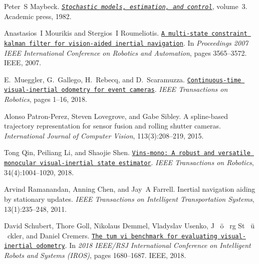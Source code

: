 \begin{DoxyDescription}
\item[\label{_CITEREF_Maybeck1982STOC}%
\mbox{[}15\mbox{]}]Peter~S Maybeck. \href{https://books.google.com/books?id=L_YVMUJKNQUC}{\tt {\itshape Stochastic models, estimation, and control}}, volume~3. Academic press, 1982.


\item[\label{_CITEREF_Mourikis2007ICRA}%
\mbox{[}16\mbox{]}]Anastasios~I Mourikis and Stergios~I Roumeliotis. \href{http://citeseerx.ist.psu.edu/viewdoc/download?doi=10.1.1.437.1085&amp;rep=rep1&amp;type=pdf}{\tt A multi-\/state constraint kalman filter for vision-\/aided inertial navigation}. In {\itshape Proceedings 2007 I\+E\+EE International Conference on Robotics and Automation}, pages 3565--3572. I\+E\+EE, 2007.


\item[\label{_CITEREF_Mueggler2018TRO}%
\mbox{[}17\mbox{]}]E.~Mueggler, G.~Gallego, H.~Rebecq, and D.~Scaramuzza. \href{http://rpg.ifi.uzh.ch/docs/TRO18_Mueggler.pdf}{\tt Continuous-\/time visual-\/inertial odometry for event cameras}. {\itshape I\+E\+EE Transactions on Robotics}, pages 1--16, 2018.


\item[\label{_CITEREF_Patron2015IJCV}%
\mbox{[}18\mbox{]}]Alonso Patron-\/\+Perez, Steven Lovegrove, and Gabe Sibley. A spline-\/based trajectory representation for sensor fusion and rolling shutter cameras. {\itshape International Journal of Computer Vision}, 113(3)\+:208--219, 2015.


\item[\label{_CITEREF_Qin2018TRO}%
\mbox{[}19\mbox{]}]Tong Qin, Peiliang Li, and Shaojie Shen. \href{https://arxiv.org/pdf/1708.03852.pdf}{\tt Vins-\/mono\+: A robust and versatile monocular visual-\/inertial state estimator}. {\itshape I\+E\+EE Transactions on Robotics}, 34(4)\+:1004--1020, 2018.


\item[\label{_CITEREF_Ramanandan2011TITS}%
\mbox{[}20\mbox{]}]Arvind Ramanandan, Anning Chen, and Jay~A Farrell. Inertial navigation aiding by stationary updates. {\itshape I\+E\+EE Transactions on Intelligent Transportation Systems}, 13(1)\+:235--248, 2011.


\item[\label{_CITEREF_Schubert2018IROS}%
\mbox{[}21\mbox{]}]David Schubert, Thore Goll, Nikolaus Demmel, Vladyslav Usenko, J~ \"{o} ~rg St~ \"{u} ~ckler, and Daniel Cremers. \href{https://arxiv.org/pdf/1804.06120.pdf}{\tt The tum vi benchmark for evaluating visual-\/inertial odometry}. In {\itshape 2018 I\+E\+E\+E/\+R\+SJ International Conference on Intelligent Robots and Systems (I\+R\+OS)}, pages 1680--1687. I\+E\+EE, 2018.



\end{DoxyDescription}
